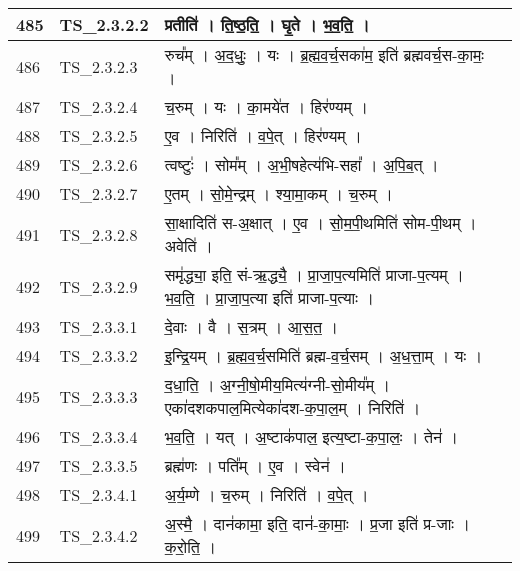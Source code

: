 \documentclass[17pt]{extarticle}
\begin{document}
\begin{longtable}{||p{0.4in}||p{0.9in}||p{4.0in}||p{0.9in}||}
        \hline
            485 & TS\_2.3.2.2 & प्रतीति॑   ।   ति॒ष्ठ॒ति॒   ।   घृ॒ते   ।   भ॒व॒ति॒   ।    &      \\
        \hline
            486 & TS\_2.3.2.3 & रुच᳚म्   ।   अ॒द॒धुः॒   ।   यः   ।   ब्र॒ह्म॒व॒र्च॒सका॑म॒ इति॑ ब्रह्मवर्च॒स{-}का॒मः॒   ।    &      \\
        \hline
            487 & TS\_2.3.2.4 & च॒रुम्   ।   यः   ।   का॒मये॑त   ।   हिर॑ण्यम्   ।    &      \\
        \hline
            488 & TS\_2.3.2.5 & ए॒व   ।   निरिति॑   ।   व॒पे॒त्   ।   हिर॑ण्यम्   ।    &      \\
        \hline
            489 & TS\_2.3.2.6 & त्वष्टुः॑   ।   सोम᳚म्   ।   अ॒भी॒षहेत्य॑भि{-}सहा᳚   ।   अ॒पि॒ब॒त्   ।    &      \\
        \hline
            490 & TS\_2.3.2.7 & ए॒तम्   ।   सो॒मे॒न्द्रम्   ।   श्या॒मा॒कम्   ।   च॒रुम्   ।    &      \\
        \hline
            491 & TS\_2.3.2.8 & सा॒क्षादिति॑ स{-}अ॒क्षात्   ।   ए॒व   ।   सो॒म॒पी॒थमिति॑ सोम{-}पी॒थम्   ।   अवेति॑   ।    &      \\
        \hline
            492 & TS\_2.3.2.9 & समृ॑द्ध्या॒ इति॒ सं{-}ऋ॒द्ध्यै॒   ।   प्रा॒जा॒प॒त्यमिति॑ प्राजा{-}प॒त्यम्   ।   भ॒व॒ति॒   ।   प्रा॒जा॒प॒त्या इति॑ प्राजा{-}प॒त्याः   ।    &      \\
        \hline
            493 & TS\_2.3.3.1 & दे॒वाः   ।   वै   ।   स॒त्रम्   ।   आ॒स॒त॒   ।    &      \\
        \hline
            494 & TS\_2.3.3.2 & इ॒न्द्रि॒यम्   ।   ब्र॒ह्म॒व॒र्च॒समिति॑ ब्रह्म{-}व॒र्च॒सम्   ।   अ॒ध॒त्ता॒म्   ।   यः   ।    &      \\
        \hline
            495 & TS\_2.3.3.3 & द॒धा॒ति॒   ।   अ॒ग्नी॒षो॒मीय॒मित्य॑ग्नी{-}सो॒मीय᳚म्   ।   एका॑दशकपाल॒मित्येका॑दश{-}क॒पा॒ल॒म्   ।   निरिति॑   ।    &      \\
        \hline
            496 & TS\_2.3.3.4 & भ॒व॒ति॒   ।   यत्   ।   अ॒ष्टाक॑पाल॒ इत्य॒ष्टा{-}क॒पा॒लः॒   ।   तेन॑   ।    &      \\
        \hline
            497 & TS\_2.3.3.5 & ब्रह्म॑णः   ।   पति᳚म्   ।   ए॒व   ।   स्वेन॑   ।    &      \\
        \hline
            498 & TS\_2.3.4.1 & अ॒र्य॒म्णे   ।   च॒रुम्   ।   निरिति॑   ।   व॒पे॒त्   ।    &      \\
        \hline
            499 & TS\_2.3.4.2 & अ॒स्मै॒   ।   दान॑कामा॒ इति॒ दान॑{-}का॒माः॒   ।   प्र॒जा इति॑ प्र{-}जाः   ।   क॒रो॒ति॒   ।    &      \\

\end{longtable}
\end{document}
